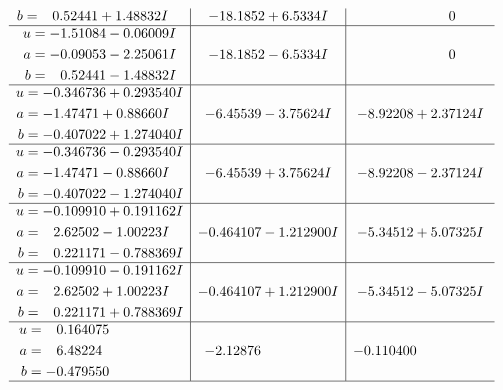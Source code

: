 \documentclass[1p]{elsarticle_modified}
\theoremstyle{definition}
\begin{document}
$$\begin{array}{c|c|c}
\begin{aligned}
b &= \phantom{-}0.52441 + 1.48832 I\end{aligned}
 & -18.1852 + 6.5334 I & \phantom{-0.000000 } 0 \\ \hline\begin{aligned}
u &= -1.51084 - 0.06009 I \\
a &= -0.09053 - 2.25061 I \\
b &= \phantom{-}0.52441 - 1.48832 I\end{aligned}
 & -18.1852 - 6.5334 I & \phantom{-0.000000 } 0 \\ \hline\begin{aligned}
u &= -0.346736 + 0.293540 I \\
a &= -1.47471 + 0.88660 I \\
b &= -0.407022 + 1.274040 I\end{aligned}
 & -6.45539 - 3.75624 I & -8.92208 + 2.37124 I \\ \hline\begin{aligned}
u &= -0.346736 - 0.293540 I \\
a &= -1.47471 - 0.88660 I \\
b &= -0.407022 - 1.274040 I\end{aligned}
 & -6.45539 + 3.75624 I & -8.92208 - 2.37124 I \\ \hline\begin{aligned}
u &= -0.109910 + 0.191162 I \\
a &= \phantom{-}2.62502 - 1.00223 I \\
b &= \phantom{-}0.221171 - 0.788369 I\end{aligned}
 & -0.464107 - 1.212900 I & -5.34512 + 5.07325 I \\ \hline\begin{aligned}
u &= -0.109910 - 0.191162 I \\
a &= \phantom{-}2.62502 + 1.00223 I \\
b &= \phantom{-}0.221171 + 0.788369 I\end{aligned}
 & -0.464107 + 1.212900 I & -5.34512 - 5.07325 I \\ \hline\begin{aligned}
u &= \phantom{-}0.164075\phantom{ +0.000000I} \\
a &= \phantom{-}6.48224\phantom{ +0.000000I} \\
b &= -0.479550\phantom{ +0.000000I}\end{aligned}
 & -2.12876\phantom{ +0.000000I} & -0.110400\phantom{ +0.000000I}\\
 \hline 
 \end{array}$$\newpage\newpage\renewcommand{\arraystretch}{1}
\end{document}
